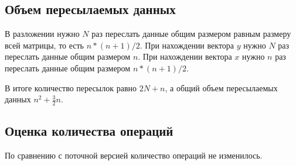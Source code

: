 \documentclass[a4paper, 12pt]{article}
\begin{document}
\subsection{Объем пересылаемых данных}
В разложении нужно $N$ раз переслать данные общим размером равным
размеру всей матрицы, то есть $n*(n+1)/2$.
При нахождении вектора $y$ нужно $N$ раз переслать данные общим размером
$n$.
При нахождении вектора $x$ нужно $n$ раз переслать данные общим размером
$n*(n+1)/2$.

В итоге количество пересылок равно $2N+n$, а общий объем 
пересылаемых данных $n^2 + \frac{3}{2}n$.
\subsection{Оценка количества операций}
По сравнению с поточной версией количество операций не изменилось.
\end{document}
